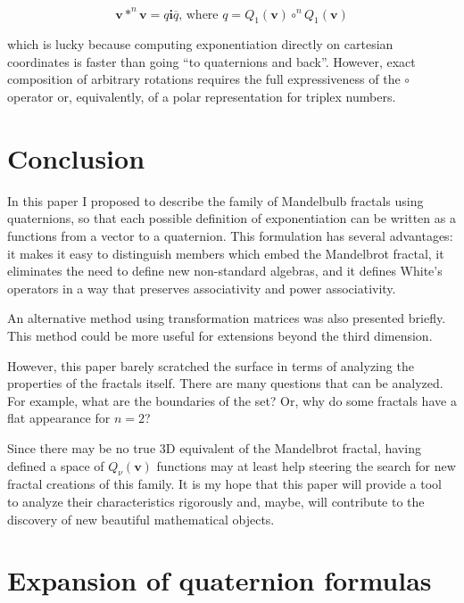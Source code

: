 \documentclass{article}
\let\vec\mathbf
\let\bar\overline
\newcommand{\where}{\text{, where }}
\begin{document}
\begin{equation*}
\vec{v} \ast^{n} \vec{v} = q\vec{i}\bar q
   \where  q=Q_1(\vec{v}) \circ^{n} Q_1(\vec{v})
\end{equation*}

\noindent
which is lucky because computing exponentiation directly on cartesian
coordinates is faster than going ``to quaternions and back''.
However, exact composition of arbitrary rotations requires the full
expressiveness of the $\circ$ operator or, equivalently, of a polar
representation for triplex numbers.

\section{Conclusion}
\label{sec:concl}

In this paper I proposed to describe the family of Mandelbulb fractals
using quaternions, so that each possible definition of exponentiation
can be written as a functions from a vector to a quaternion.  This
formulation has several advantages: it makes it easy to distinguish
members which embed the Mandelbrot fractal, it eliminates the need to
define new non-standard algebras, and it defines White's operators in
a way that preserves associativity and power associativity.

An alternative method using transformation matrices was also presented
briefly.  This method could be more useful for extensions beyond the
third dimension.

However, this paper barely scratched the surface in terms of analyzing
the properties of the fractals itself.  There are many questions that
can be analyzed.  For example, what are the boundaries of the set?
Or, why do some fractals have a flat appearance for $n = 2$?

Since there may be no true 3D equivalent of the Mandelbrot fractal,
having defined a space of $Q_\nu(\vec{v})$ functions may at least help
steering the search for new fractal creations of this family.  It is
my hope that this paper will provide a tool to analyze their
characteristics rigorously and, maybe, will contribute to the
discovery of new beautiful mathematical objects.

\newpage
\appendix
\section{Expansion of quaternion formulas}
\end{document}

